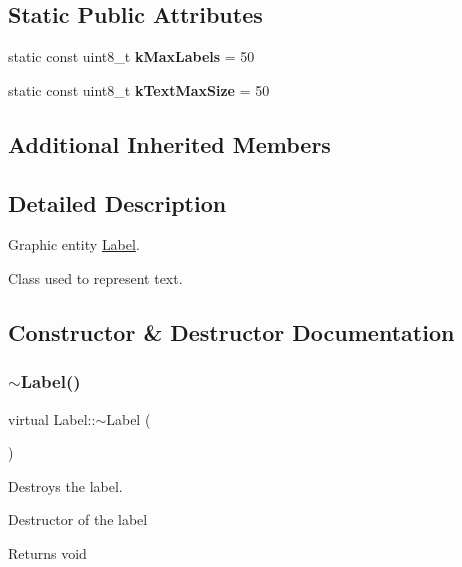 \subsection*{Static Public Attributes}
\begin{DoxyCompactItemize}
\item 
\mbox{\label{class_label_a00ba8c3c345de6f169c739243aad2634}} 
static const uint8\+\_\+t {\bfseries k\+Max\+Labels} = 50
\item 
\mbox{\label{class_label_a73c9a955b95b4e3dfbba8b4a7771d64a}} 
static const uint8\+\_\+t {\bfseries k\+Text\+Max\+Size} = 50
\end{DoxyCompactItemize}
\subsection*{Additional Inherited Members}


\subsection{Detailed Description}
Graphic entity \hyperlink{class_label}{Label}. 

Class used to represent text. 

\subsection{Constructor \& Destructor Documentation}
\mbox{\label{class_label_ae0405d591a2ff63c03b104435e2a3066}} 
\subsubsection{\texorpdfstring{$\sim$\+Label()}{~Label()}}
{\footnotesize\ttfamily virtual Label\+::$\sim$\+Label (\begin{DoxyParamCaption}{ }\end{DoxyParamCaption})\hspace{0.3cm}{\ttfamily [virtual]}}



Destroys the label. 

Destructor of the label

\begin{DoxyReturn}{Returns}
void 
\end{DoxyReturn}


